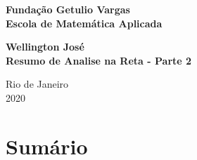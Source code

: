 \documentclass[12pt]{article}
\begin{document}
\begin{titlepage}
\begin{center}
\textbf{\LARGE Fundação Getulio Vargas}\\ 
\textbf{\LARGE Escola de Matemática Aplicada}

\par
\vspace{170pt}
\textbf{\Large Wellington José}\\
\vspace{32pt}
\textbf{\Large Resumo de Analise na Reta - Parte 2}\\
\end{center}

\par
\vfill
\begin{center}
{{\normalsize Rio de Janeiro}\\
{\normalsize 2020}}
\end{center}
\end{titlepage}

\thispagestyle{empty}

\section*{Sumário}

\textbf{}
\vspace{4mm}

\textbf{}
\vspace{4mm} \\
\textbf{}
\vspace{4mm}

\textbf{}
\vspace{4mm}

\textbf{}
\vspace{4mm}

\textbf{}
\vspace{4mm}

\textbf{}
\vspace{4mm} \\
\textbf{}
\vspace{4mm}

\textbf{}
\vspace{4mm}

\textbf{}
\vspace{4mm}

\textbf{}
\vspace{4mm}
\end{document}
